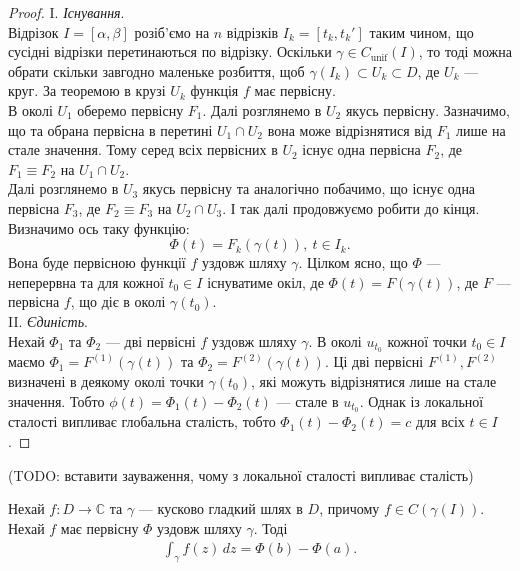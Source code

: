 \documentclass{math_library}
\begin{document}
\begin{proof}
I. \textit{Існування}.\\
Відрізок $I = [\alpha,\beta]$ розіб'ємо на $n$ відрізків $I_k = [t_k,t_{k}']$ таким чином, що сусідні відрізки перетинаються по відрізку. Оскільки $\gamma \in C_{\text{unif}}(I)$, то тоді можна обрати скільки завгодно маленьке розбиття, щоб $\gamma(I_k) \subset U_k \subset D$, де $U_k$ --- круг. За теоремою  в крузі $U_k$ функція $f$ має первісну.\\
В околі $U_1$ оберемо первісну $F_1$. Далі розглянемо в $U_2$ якусь первісну. Зазначимо, що та обрана первісна в перетині $U_1 \cap U_2$ вона може відрізнятися від $F_1$ лише на стале значення. Тому серед всіх первісних в $U_2$ існує одна первісна $F_2$, де $F_1 \equiv F_2$ на $U_1 \cap U_2$.\\
Далі розглянемо в $U_3$ якусь первісну та аналогічно побачимо, що існує одна первісна $F_3$, де $F_2 \equiv F_3$ на $U_2 \cap U_3$. І так далі продовжуємо робити до кінця.
Визначимо ось таку функцію:
\[
\Phi(t) = F_k(\gamma(t)),\ t \in I_k.
\]
Вона буде первісною функції $f$ уздовж шляху $\gamma$. Цілком ясно, що $\Phi$ --- неперервна та для кожної $t_0 \in I$ існуватиме окіл, де $\Phi(t) = F(\gamma(t))$, де $F$ --- первісна $f$, що діє в околі $\gamma(t_0)$.
\bigskip \\
II. \textit{Єдиність}.\\
Нехай $\Phi_1$ та $\Phi_2$ --- дві первісні $f$ уздовж шляху $\gamma$. В околі $u_{t_0}$ кожної точки $t_0 \in I$ маємо $\Phi_1 = F^{(1)}(\gamma(t))$ та $\Phi_2 = F^{(2)}(\gamma(t))$. Ці дві первісні $F^{(1)},F^{(2)}$ визначені в деякому околі точки $\gamma(t_0)$, які можуть відрізнятися лише на стале значення. Тобто $\phi(t) = \Phi_1(t) - \Phi_2(t)$ --- стале в $u_{t_0}$. Однак із локальної сталості випливає глобальна сталість, тобто $\Phi_1(t) - \Phi_2(t) = c$ для всіх $t \in I$.
\end{proof}

(TODO: вставити зауваження, чому з локальної сталості випливає сталість)

\begin{theorem}
Нехай $f \colon D \to \mathbb{C}$ та $\gamma$ --- кусково гладкий шлях в $D$, причому $f \in C(\gamma(I))$. Нехай $f$ має первісну $\Phi$ уздовж шляху $\gamma$. Тоді
\begin{align*}
\int_\gamma f(z)\,dz = \Phi(b) - \Phi(a).
\end{align*}
\end{theorem}
\end{document}
